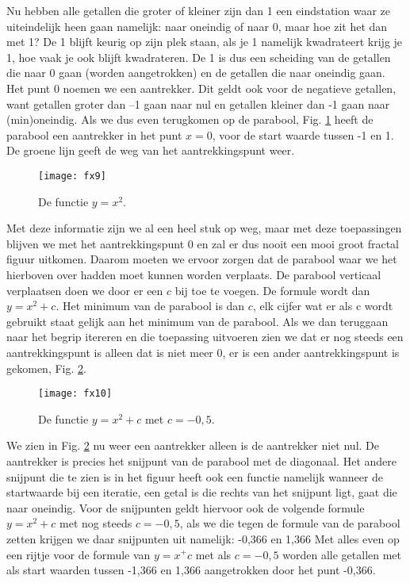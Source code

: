\documentclass[11pt,fleqn]{book} %
\begin{document}
Nu hebben alle getallen die groter of kleiner zijn dan 1 een eindstation waar ze uiteindelijk heen gaan namelijk: naar oneindig of naar 0, maar hoe zit het dan met 1? De 1 blijft keurig op zijn plek staan, als je 1 namelijk kwadrateert krijg je 1, hoe vaak je ook blijft kwadrateren. De 1 is dus een scheiding van de getallen die naar 0 gaan (worden aangetrokken) en de getallen die naar oneindig gaan. Het punt 0 noemen we een aantrekker. Dit geldt ook voor de negatieve getallen, want getallen groter dan –1 gaan naar nul en getallen kleiner dan -1 gaan naar (min)oneindig. Als we dus even terugkomen op de parabool, Fig. \ref{fig:fx9} heeft de parabool een aantrekker in het punt $x=0$, voor de start waarde tussen -1 en 1. De groene lijn geeft de weg van het aantrekkingspunt weer.
\begin{figure}[h]
	\centering\texttt{[image: fx9]}
	\caption{De functie $y=x^2$.}
	\label{fig:fx9}
\end{figure}
Met deze informatie zijn we al een heel stuk op weg, maar met deze toepassingen blijven we met het aantrekkingspunt 0 en zal er dus nooit een mooi groot fractal figuur uitkomen. Daarom moeten we ervoor zorgen dat de parabool waar we het hierboven over hadden moet kunnen worden verplaats. De parabool verticaal verplaatsen doen we door er een $c$ bij toe te voegen. De formule wordt dan $y=x^2+c$. Het minimum van de parabool is dan $c$, elk cijfer wat er als c wordt gebruikt staat gelijk aan het minimum van de parabool. Als we dan teruggaan naar het begrip itereren en die toepassing uitvoeren zien we dat er nog steeds een aantrekkingspunt is alleen dat is niet meer 0, er is een ander aantrekkingspunt is gekomen, Fig. \ref{fig:fx10}.
\begin{figure}[h]
	\centering\texttt{[image: fx10]}
	\caption{De functie $y=x^2+c$ met $c=-0,5$.}
	\label{fig:fx10}
\end{figure}
We zien in Fig. \ref{fig:fx10} nu weer een aantrekker alleen is de aantrekker niet nul. De aantrekker is precies het snijpunt van de parabool met de diagonaal. Het andere snijpunt die te zien is in het figuur heeft ook een functie namelijk wanneer de startwaarde bij een iteratie, een getal is die rechts van het snijpunt ligt, gaat die naar oneindig. Voor de snijpunten geldt hiervoor ook de volgende formule $y=x^2+c$ met nog steeds $c=-0,5$, als we die tegen de formule van de parabool zetten krijgen we daar snijpunten uit namelijk: -0,366 en 1,366
Met alles even op een rijtje voor de formule van $y=x^+c$ met als $c= -0,5$ worden alle getallen met als start waarden tussen -1,366 en 1,366 aangetrokken door het punt -0,366.
\end{document}
